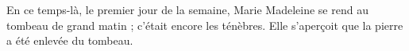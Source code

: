 En ce temps-là, le premier jour de la semaine, Marie Madeleine se rend au tombeau de grand matin ; c’était encore les ténèbres. Elle s’aperçoit que la pierre a été enlevée du tombeau.